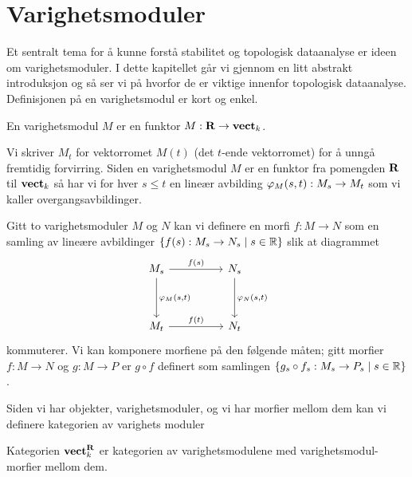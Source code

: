 \section{Varighetsmoduler}


Et sentralt tema for å kunne forstå stabilitet og topologisk dataanalyse er ideen om varighetsmoduler. I dette kapitellet går vi gjennom en litt abstrakt introduksjon og så ser vi på hvorfor de er viktige innenfor topologisk dataanalyse. Definisjonen på en varighetsmodul er kort og enkel.

\begin{definisjon}\label{Def:PersMod}
    En varighetsmodul $M$ er en funktor $M:\textnormal{\textbf{{R}}}\to\textnormal{\textbf{vect}}_k$.
\end{definisjon}

Vi skriver $M_t$ for vektorromet $M(t)$ (det $t$-ende vektorromet) for å unngå fremtidig forvirring.
Siden en varighetsmodul $M$ er en funktor fra pomengden $\textnormal{\textbf{{R}}}$ til $\textnormal{\textbf{vect}}_k$ så har vi for hver $s\leq t$ en lineær avbilding $\varphi_M(s,t): M_s\to M_t$ som vi kaller overgangsavbildinger.

Gitt to varighetsmoduler $M$ og $N$ kan vi definere en morfi $f: M\to N$ som en samling av lineære avbildinger
$\{f(s): M_s\to N_s\;|\; s\in\mathbb{R}\}$ slik at diagrammet
\[
\begin{tikzcd}
	{M_s} && {N_s} \\
	\\
	{M_t} && {N_t}
	\arrow["{f(s)}", from=1-1, to=1-3]
	\arrow["{\p_M(s,t)}", from=1-1, to=3-1]
	\arrow["{\p_N(s,t)}", from=1-3, to=3-3]
	\arrow["{f(t)}", from=3-1, to=3-3]
\end{tikzcd}
\]
kommuterer. Vi kan komponere morfiene på den følgende måten; gitt morfier $f:M\to N$ og $g:M\to P$ er $g\circ f$
definert som samlingen $\{g_s\circ f_s: M_s\to P_s\;|\;s\in\mathbb{R}\}$.

Siden vi har objekter, varighetsmoduler, og vi har morfier mellom dem kan vi definere kategorien av varighets moduler

\begin{definisjon}\label{Def:KatPMod}
    Kategorien $\textnormal{\textbf{vect}}_k^{\textnormal{\textbf{{R}}}}$ er kategorien av varighetsmodulene med varighetsmodul-morfier mellom dem.
\end{definisjon}

